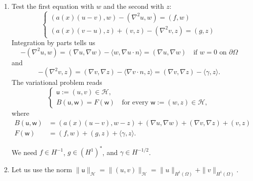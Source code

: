 \documentclass[letterpaper,twoside,11pt]{article}
\theoremstyle{mystyle}
\begin{document}
\begin{enumerate}
  \item Test the first equation with $w$ and the second with $z$: 
  \[\left\{ {\begin{array}{*{20}{l}}
    \left( a(x) (u-v), w \right) - \left( \nabla^2 u, w \right) = \left( f, w \right) \\[.2cm] 
    \left( a(x)(v-u), z \right) + \left( v, z \right) - \left( \nabla^2 v, z \right) = \left( g, z \right)
  \end{array}} \right.\]
  Integration by parts tells us 
  \[-\left( \nabla^2 u, w \right) = \left( \nabla u, \nabla w \right) - \langle w, \nabla u\cdot n \rangle = \left( \nabla u, \nabla w \right) \quad \text{if } w = 0 \text{ on } \partial \Omega\]
  and
  \[-\left( \nabla^2 v, z \right) = \left( \nabla v, \nabla z \right) - \langle \nabla v \cdot n, z\rangle = \left( \nabla v, \nabla z \right) - \langle \gamma , z\rangle.\]
  The variational problem reads 
  \[\left\{ {\begin{array}{*{20}{l}}
    \mathsf u := \left( u,v \right)\in \mathcal H,\\[.2cm]
    B\left( \mathsf u, \mathsf w \right) = F\left( \mathsf w \right)
    \quad \text{for every } \mathsf w :=\left( w, z \right)\in \mathcal H,
  \end{array}} \right.\]
  where 
  \begin{align*}
    B\left( \mathsf u, \mathsf w \right) &= \left( a(x) (u-v), w-z \right) + \left( \nabla u, \nabla w \right) + \left( \nabla v, \nabla z \right) + \left( v, z \right) \\
    F\left( \mathsf w \right) &= \left( f, w \right) + \left( g, z \right) + \langle \gamma, z\rangle.
  \end{align*}

  We need $f \in H^{-1}$, $g \in \left( H^1  \right)^*$, and $\gamma \in H^{-1/2}$. 

  \item Let us use the norm $\|\mathsf u\|_{\mathcal H} = \|\left( u,v \right)\|_{\mathcal H} = \|u\|_{H^1\left( \Omega \right)} + \|v\|_{H^1\left( \Omega \right)}$. 
  

\end{enumerate}
\end{document}
